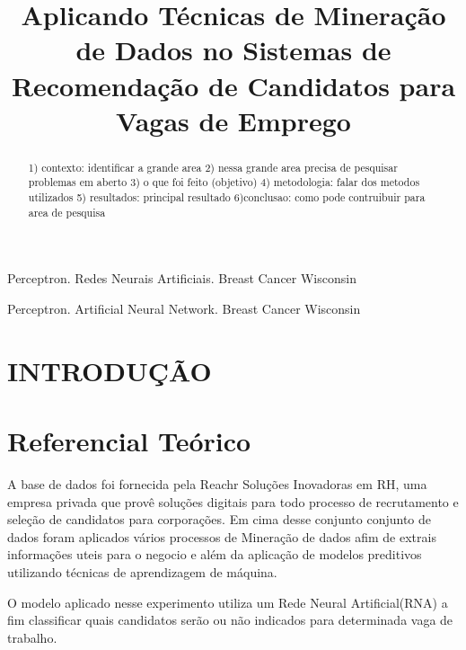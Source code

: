 \documentclass[conference]{IEEEtran}
\begin{document}
\title{Aplicando Técnicas de Mineração de Dados no Sistemas de Recomendação de Candidatos para Vagas de Emprego}

\author{
    \and
}
\maketitle

\begin{abstract}
 1) contexto: identificar a grande area
 2) nessa grande area precisa de pesquisar problemas em aberto
 3) o que foi feito (objetivo)
 4) metodologia: falar dos metodos utilizados
 5) resultados: principal resultado
 6)conclusao: como pode contruibuir para area de pesquisa

\end{abstract}

\begin{IEEEkeywords}
Perceptron. Redes Neurais Artificiais. Breast Cancer Wisconsin
\end{IEEEkeywords}
\begin{abstract}


\end{abstract}
\begin{IEEEkeywords}
Perceptron. Artificial Neural Network. Breast Cancer Wisconsin
\end{IEEEkeywords}

\section{INTRODUÇÃO}

    

\section{Referencial Teórico}
	
    A base de dados foi fornecida pela Reachr Soluções Inovadoras em RH, uma empresa privada que provê soluções digitais para todo processo de recrutamento e seleção de candidatos para corporações. Em cima desse conjunto conjunto de dados foram aplicados vários processos de Mineração de dados afim de extrais informações uteis para o negocio e além da aplicação de modelos preditivos utilizando técnicas de aprendizagem de máquina.
    	
    O modelo aplicado nesse experimento utiliza um Rede Neural Artificial(RNA)  a fim classificar quais candidatos serão ou não indicados para determinada vaga de trabalho. 
    	
\end{document}
